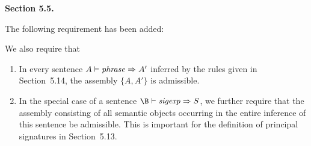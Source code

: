 {\samepage
\noindent
{\bf Section 5.5.}
\medskip

\noindent
The following requirement has been added:
\medskip

}
We also require that
\begin{enumerate}
\item In every sentence $A\vdash{\it phrase}\Rightarrow A'$  inferred by the rules
given in Section~5.14, the assembly $\{A,A'\}$ is
admissible.
\item In the special case of a sentence $\B\ts\sigexp\ra\S$,
we further require that the assembly consisting of all semantic
objects occurring in the entire inference of this sentence be
admissible. This  is important for the definition of principal
signatures in Section~5.13.
\end{enumerate}
\medskip

